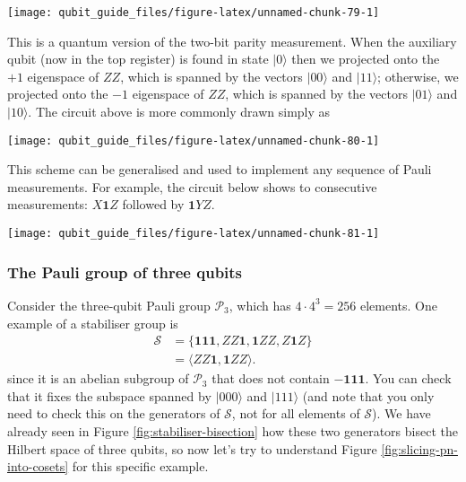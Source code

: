 \documentclass[fleqn]{article}
\begin{document}
\begin{center}\texttt{[image: qubit\_guide\_files/figure-latex/unnamed-chunk-79-1]} \end{center}

This is a quantum version of the two-bit parity measurement.
When the auxiliary qubit (now in the top register) is found in state \(|0\rangle\) then we projected onto the \(+1\) eigenspace of \(ZZ\), which is spanned by the vectors \(|00\rangle\) and \(|11\rangle\); otherwise, we projected onto the \(-1\) eigenspace of \(ZZ\), which is spanned by the vectors \(|01\rangle\) and \(|10\rangle\).
The circuit above is more commonly drawn simply as

\begin{center}\texttt{[image: qubit\_guide\_files/figure-latex/unnamed-chunk-80-1]} \end{center}

This scheme can be generalised and used to implement any sequence of Pauli measurements.
For example, the circuit below shows to consecutive measurements: \(X\mathbf{1}Z\) followed by \(\mathbf{1}YZ\).

\begin{center}\texttt{[image: qubit\_guide\_files/figure-latex/unnamed-chunk-81-1]} \end{center}

\hypertarget{pauli-group-three-qubits-worked-example}{%
\subsubsection{The Pauli group of three qubits}\label{pauli-group-three-qubits-worked-example}}

Consider the three-qubit Pauli group \(\mathcal{P}_3\), which has \(4\cdot 4^3=256\) elements.
One example of a stabiliser group is
\[
  \begin{aligned}
    \mathcal{S}
    &= \{\mathbf{1}\mathbf{1}\mathbf{1},ZZ\mathbf{1},\mathbf{1}ZZ, Z\mathbf{1}Z\}
  \\&= \langle ZZ\mathbf{1},\mathbf{1}ZZ\rangle.
  \end{aligned}
\]
since it is an abelian subgroup of \(\mathcal{P}_3\) that does not contain \(-\mathbf{1}\mathbf{1}\mathbf{1}\).
You can check that it fixes the subspace spanned by \(|000\rangle\) and \(|111\rangle\) (and note that you only need to check this on the generators of \(\mathcal{S}\), not for all elements of \(\mathcal{S}\)).
We have already seen in Figure \ref{fig:stabiliser-bisection} how these two generators bisect the Hilbert space of three qubits, so now let's try to understand Figure \ref{fig:slicing-pn-into-cosets} for this specific example.
\end{document}
